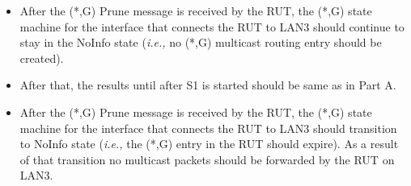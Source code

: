 \documentclass[11pt]{report}
\newcommand{\ie}{\emph{i.e.,}\xspace}
\begin{document}

\begin{itemize}

  \item After the (*,G) Prune message is received by the RUT,
  the (*,G) state machine for the interface that connects the RUT to
  LAN3 should continue to stay in the NoInfo state (\ie no (*,G) multicast
  routing entry should be created).

  \item After that, the results until after S1 is started should be same as in
  Part A.

  \item After the (*,G) Prune message is received by the RUT,
  the (*,G) state machine for the interface that connects the RUT to
  LAN3 should transition to NoInfo state
  (\ie the (*,G) entry in the RUT should expire).
  As a result of that transition no multicast packets should be
  forwarded by the RUT on LAN3.

\end{itemize}

\end{document}
